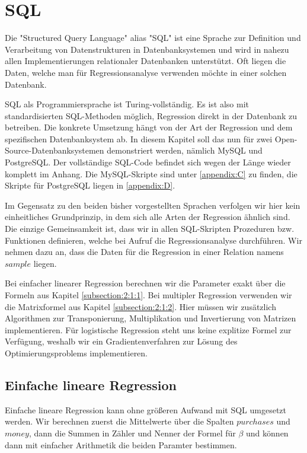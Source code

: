 \section{SQL}
\label{section:3:4}

Die "Structured Query Language" alias "SQL" ist eine Sprache zur Definition und Verarbeitung von Datenstrukturen in Datenbanksystemen und wird in nahezu allen Implementierungen relationaler Datenbanken unterstützt. Oft liegen die Daten, welche man für Regressionsanalyse verwenden möchte in einer solchen Datenbank.

SQL als Programmiersprache ist Turing-vollständig. Es ist also mit standardisierten SQL-Methoden möglich, Regression direkt in der Datenbank zu betreiben. Die konkrete Umsetzung hängt von der Art der Regression und dem spezifischen Datenbanksystem ab. In diesem Kapitel soll das nun für zwei Open-Source-Datenbanksystemen demonstriert werden, nämlich MySQL und PostgreSQL. Der vollständige SQL-Code befindet sich wegen der Länge wieder komplett im Anhang. Die MySQL-Skripte sind unter \ref{appendix:C} zu finden, die Skripte für PostgreSQL liegen in \ref{appendix:D}.

Im Gegensatz zu den beiden bisher vorgestellten Sprachen verfolgen wir hier kein einheitliches Grundprinzip, in dem sich alle Arten der Regression ähnlich sind. Die einzige Gemeinsamkeit ist, dass wir in allen SQL-Skripten Prozeduren bzw. Funktionen definieren, welche bei Aufruf die Regressionsanalyse durchführen. Wir nehmen dazu an, dass die Daten für die Regression in einer Relation namens $sample$ liegen.

Bei einfacher linearer Regression berechnen wir die Parameter exakt über die Formeln aus Kapitel \ref{subsection:2:1:1}. Bei multipler Regression verwenden wir die Matrixformel aus Kapitel \ref{subsection:2:1:2}. Hier müssen wir zusätzlich Algorithmen zur Transponierung, Multiplikation und Invertierung von Matrizen implementieren. Für logistische Regression steht uns keine explitize Formel zur Verfügung, weshalb wir ein Gradientenverfahren zur Lösung des Optimierungsproblems implementieren.

\subsection{Einfache lineare Regression}
\label{subsection:3:4:1}

Einfache lineare Regression kann ohne größeren Aufwand mit SQL umgesetzt werden. Wir berechnen zuerst die Mittelwerte über die Spalten $purchases$ und $money$, dann die Summen in Zähler und Nenner der Formel für $\beta$ und können dann mit einfacher Arithmetik die beiden Paramter bestimmen.

